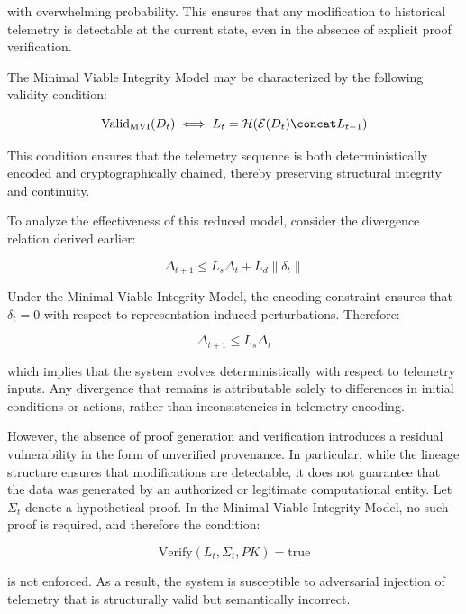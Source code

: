 with overwhelming probability. This ensures that any modification to historical telemetry is detectable at the current state, even in the absence of explicit proof verification.

The Minimal Viable Integrity Model may be characterized by the following validity condition:

\begin{equation}
\text{Valid}_{\text{MVI}}(D_t) \iff L_t = \mathcal{H}(\mathcal{E}(D_t) \concat L_{t-1})
\end{equation}

This condition ensures that the telemetry sequence is both deterministically encoded and cryptographically chained, thereby preserving structural integrity and continuity.

To analyze the effectiveness of this reduced model, consider the divergence relation derived earlier:

\begin{equation}
\Delta_{t+1} \leq L_s \Delta_t + L_d \|\delta_t\|
\end{equation}

Under the Minimal Viable Integrity Model, the encoding constraint ensures that $\delta_t = 0$ with respect to representation-induced perturbations. Therefore:

\begin{equation}
\Delta_{t+1} \leq L_s \Delta_t
\end{equation}

which implies that the system evolves deterministically with respect to telemetry inputs. Any divergence that remains is attributable solely to differences in initial conditions or actions, rather than inconsistencies in telemetry encoding.

However, the absence of proof generation and verification introduces a residual vulnerability in the form of unverified provenance. In particular, while the lineage structure ensures that modifications are detectable, it does not guarantee that the data was generated by an authorized or legitimate computational entity. Let $\Sigma_t$ denote a hypothetical proof. In the Minimal Viable Integrity Model, no such proof is required, and therefore the condition:

\begin{equation}
\text{Verify}(L_t, \Sigma_t, PK) = \text{true}
\end{equation}

is not enforced. As a result, the system is susceptible to adversarial injection of telemetry that is structurally valid but semantically incorrect.

